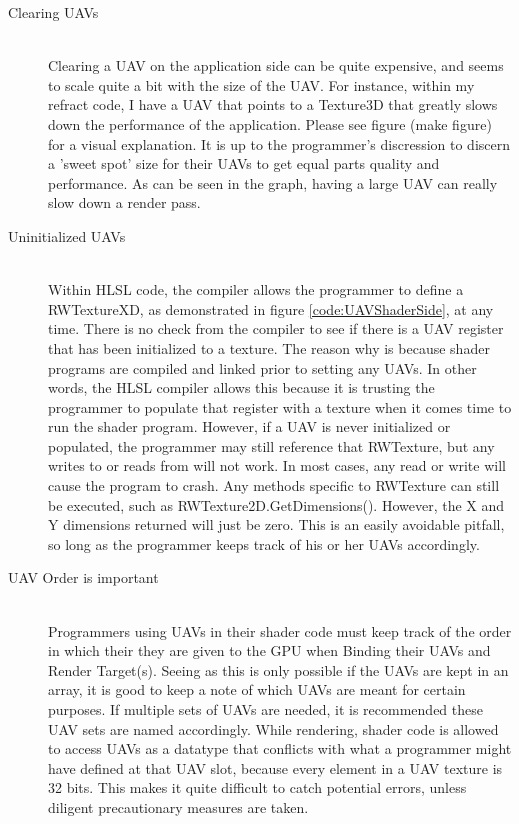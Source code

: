 \documentclass[a4paper, 12pt]{article}
\begin{document}
\begin{description}

\item[Clearing UAVs] \hfill \\ 

Clearing a UAV on the application side can be quite expensive, and seems to
scale quite a bit with the size of the UAV. For instance, within my refract
code, I have a UAV that points to a Texture3D that greatly slows down the
performance of the application. Please see figure (make figure) for a visual
explanation. It is up to the programmer's discression to discern a 'sweet
spot' size for their UAVs to get equal parts quality and performance. As can
be seen in the graph, having a large UAV can really slow down a render pass.

\item[Uninitialized UAVs] \hfill \\

Within HLSL code, the compiler allows the programmer to define a RWTextureXD,
as demonstrated in figure \ref{code:UAVShaderSide}, at any time. There is no
check from the compiler to see if there is a UAV register that has been
initialized to a texture. The reason why is because shader programs are
compiled and linked prior to setting any UAVs. In other words, the HLSL
compiler allows this because it is trusting the programmer to populate that
register with a texture when it comes time to run the shader program. However,
if a UAV is never initialized or populated, the programmer may still reference
that RWTexture, but any writes to or reads from will not work. In most cases,
any read or write will cause the program to crash. Any methods specific to
RWTexture can still be executed, such as RWTexture2D.GetDimensions(). However,
the X and Y dimensions returned will just be zero. This is an easily avoidable
pitfall, so long as the programmer keeps track of his or her UAVs accordingly.

\item[UAV Order is important] \hfill \\

Programmers using UAVs in their shader code must keep track of the order in
which their they are given to the GPU when Binding their UAVs and Render
Target(s). Seeing as this is only possible if the UAVs are kept in an array,
it is good to keep a note of which UAVs are meant for certain purposes. If
multiple sets of UAVs are needed, it is recommended these UAV sets are named
accordingly. While rendering, shader code is allowed to access UAVs as a
datatype that conflicts with what a programmer might have defined at that UAV
slot, because every element in a UAV texture is 32 bits. This makes it quite
difficult to catch potential errors, unless diligent precautionary measures
are taken.

\end{description}
\end{document}
